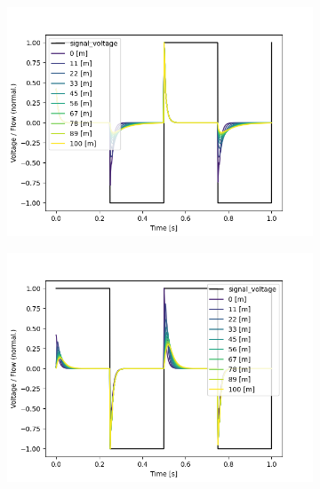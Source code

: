 \documentclass[fontsize=12pt, a4paper]{scrartcl}
\begin{document}
\begin{figure}[H]
	\centering
	\begin{subfigure}[H]{0.48\textwidth}
		\includegraphics[width=\textwidth, valign=t]{bilder/tubelength/tl_in_branch_multisweep_flow.png}
	\end{subfigure}
	\begin{subfigure}[H]{0.48\textwidth}
	\includegraphics[width=\textwidth, valign=t]{bilder/tubelength/tl_out_branch_multisweep_flow.png}
	\end{subfigure}
	\begin{subfigure}[H]{0.48\textwidth}

\end{subfigure}
\end{figure}
\end{document}
